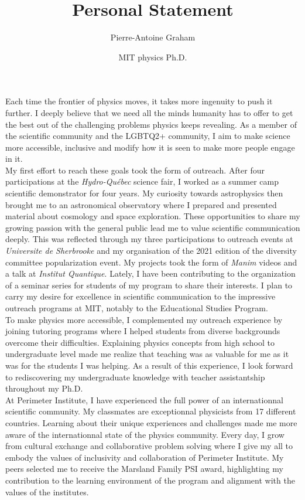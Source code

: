 \documentclass[12pt]{article}
\title{Personal Statement}
\author{Pierre-Antoine Graham}
\date{MIT physics Ph.D.}
\begin{document}
\maketitle
\vspace{0.5cm}

Each time the frontier of physics moves, it takes more ingenuity to push it further. I deeply believe that we need all the minds humanity has to offer to get the best out of the challenging problems physics keeps revealing. As a member of the scientific community and the LGBTQ2+ community, I aim to make science more accessible, inclusive and modify how it is seen to make more people engage in it.\\[0.3cm]

My first effort to reach these goals took the form of outreach. After four participations at the \textit{Hydro-Québec} science fair, I worked as a summer camp scientific demonstrator for four years. My curiosity towards astrophysics then brought me to an astronomical observatory where I prepared and presented material about cosmology and space exploration. These opportunities to share my growing passion with the general public lead me to value scientific communication deeply. This was reflected through my three participations to outreach events at \textit{Universite de Sherbrooke} and my organisation of the 2021 edition of the diversity committee popularization event. My projects took the form of \textit{Manim} videos and a talk at \textit{Institut Quantique}. Lately, I have been contributing to the organization of a seminar series for students of my program to share their interests. I plan to carry my desire for excellence in scientific communication to the impressive outreach programs at MIT, notably to the Educational Studies Program.\\[0.3cm]

To make physics more accessible, I complemented my outreach experience by joining tutoring programs where I helped students from diverse backgrounds overcome their difficulties. Explaining physics concepts from high school to undergraduate level made me realize that teaching was as valuable for me as it was for the students I was helping. As a result of this experience, I look forward to rediscovering my undergraduate knowledge with teacher assistantship throughout my Ph.D.\\[0.3cm]

At Perimeter Institute, I have experienced the full power of an internationnal scientific community. My classmates are exceptionnal physicists from 17 different countries. Learning about their unique experiences and challenges made me more aware of the internationnal state of the physics community. Every day, I grow from cultural exchange and collaborative problem solving where I give my all to embody the values of inclusivity and collaboration of Perimeter Institute. My peers selected me to receive the Marsland Family PSI award, highlighting my contribution to the learning environment of the program and alignment with the values of the institutes.\\[0.3cm]
\end{document}
